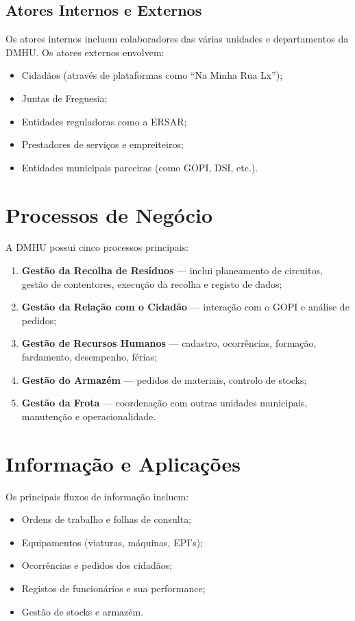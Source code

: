 \documentclass[12pt,a4paper,final]{article}
\begin{document}
    \subsection{Atores Internos e Externos}\label{subsec:atores-internos-e-externos}
    Os atores internos incluem colaboradores das várias unidades e departamentos da DMHU. Os atores externos envolvem:
    \begin{itemize}
        \item Cidadãos (através de plataformas como “Na Minha Rua Lx”);
        \item Juntas de Freguesia;
        \item Entidades reguladoras como a ERSAR;
        \item Prestadores de serviços e empreiteiros;
        \item Entidades municipais parceiras (como GOPI, DSI, etc.).
    \end{itemize}


    \section{Processos de Negócio}\label{sec:processos-de-negocio}
    A DMHU possui cinco processos principais:
    \begin{enumerate}
        \item \textbf{Gestão da Recolha de Resíduos} — inclui planeamento de circuitos, gestão de contentores, execução da recolha e registo de dados;
        \item \textbf{Gestão da Relação com o Cidadão} — interação com o GOPI e análise de pedidos;
        \item \textbf{Gestão de Recursos Humanos} — cadastro, ocorrências, formação, fardamento, desempenho, férias;
        \item \textbf{Gestão do Armazém} — pedidos de materiais, controlo de stocks;
        \item \textbf{Gestão da Frota} — coordenação com outras unidades municipais, manutenção e operacionalidade.
    \end{enumerate}


    \section{Informação e Aplicações}\label{sec:informacao-e-aplicacoes}
    Os principais fluxos de informação incluem:
    \begin{itemize}
        \item Ordens de trabalho e folhas de consulta;
        \item Equipamentos (viaturas, máquinas, EPI’s);
        \item Ocorrências e pedidos dos cidadãos;
        \item Registos de funcionários e sua performance;
        \item Gestão de stocks e armazém.
    \end{itemize}
\end{document}
